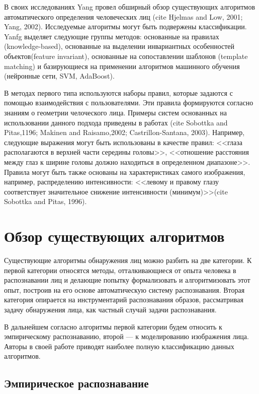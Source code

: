 В своих исследованиях Yang провел обширный обзор существующих алгоритмов автоматического определения человеческих лиц (cite Hjelmas and Low, 2001; Yang, 2002). Исследуемые алгоритмы могут быть подвержены классификации. Yanfg выделяет следующие группы методов: основанные на правилах (knowledge-based), основанные на выделении инвариантных особенностей объектов(feature invariant), основанные на сопоставлении шаблонов (template matching) и базирующиеся на применении алгоритмов машинного обучения (нейронные сети, SVM, AdaBoost).

В методах первого типа используются наборы правил, которые задаются с помощью взаимодействия с пользователями. Эти правила формируются согласно знаниям о геометрии челоческого лица. Примеры систем основанных на использовании данного подхода приведены в работах (cite Sobottka and Pitas,1196; Makinen and Raisamo,2002; Castrillon-Santana, 2003). Например, следующие выражения могут быть использованы в качестве правил: <<глаза располагаются в верхней части середины головы>>, <<отношение расстояния между глаз к ширине головы должно находиться в определенном диапазоне>>. Правила могут быть также основаны на характеристиках самого изображения, например, распределению интенсивности: <<левому и правому глазу соответствует значительное снижение интенсивности (минимум)>>(cite Sobottka and Pitas, 1996). 



\section{Обзор существующих алгоритмов}

Существующие алгоритмы обнаружения лиц можно разбить на две категории. К
первой категории относятся методы, отталкивающиеся от опыта человека в
распознавании лиц и делающие попытку формализовать и алгоритмизовать этот опыт,
построив на его основе автоматическую систему распознавания. Вторая категория
опирается на инструментарий распознавания образов, рассматривая задачу
обнаружения лица, как частный случай задачи распознавания. 

В дальнейшем согласно \cite{Veznevec_Degtyareva} алгоритмы первой категории
будем относить к эмпирическому распознаванию, второй --- к моделированию
изображения лица. Авторы \cite{Veznevec_Degtyareva} в своей работе приводят
наиболее полную классификацию данных алгоритмов.

\subsection{Эмпирическое распознавание}

